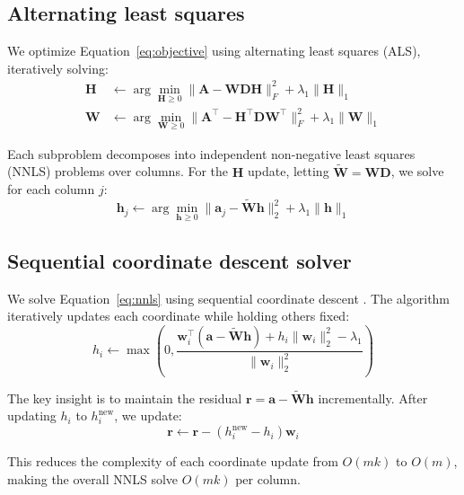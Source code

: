 \documentclass[article]{jss_modified}
\begin{document}
\subsection{Alternating least squares}

We optimize Equation~\ref{eq:objective} using alternating least squares (ALS), 
iteratively solving:
\begin{align}
  \mathbf{H} &\leftarrow \arg\min_{\mathbf{H} \geq 0} 
  \|\mathbf{A} - \mathbf{W}\mathbf{D}\mathbf{H}\|_F^2 + \lambda_1\|\mathbf{H}\|_1 
  \label{eq:h_update} \\
  \mathbf{W} &\leftarrow \arg\min_{\mathbf{W} \geq 0} 
  \|\mathbf{A}^\top - \mathbf{H}^\top\mathbf{D}\mathbf{W}^\top\|_F^2 + 
  \lambda_1\|\mathbf{W}\|_1
  \label{eq:w_update}
\end{align}

Each subproblem decomposes into independent non-negative least squares (NNLS) 
problems over columns. For the $\mathbf{H}$ update, letting 
$\tilde{\mathbf{W}} = \mathbf{W}\mathbf{D}$, we solve for each column $j$:
\begin{equation}
  \mathbf{h}_j \leftarrow \arg\min_{\mathbf{h} \geq 0} 
  \|\mathbf{a}_j - \tilde{\mathbf{W}}\mathbf{h}\|_2^2 + \lambda_1\|\mathbf{h}\|_1
  \label{eq:nnls}
\end{equation}

\subsection{Sequential coordinate descent solver}

We solve Equation~\ref{eq:nnls} using sequential coordinate descent 
\citep{Franc2005}. The algorithm iteratively updates each coordinate while 
holding others fixed:
\begin{equation}
  h_i \leftarrow \max\left(0, \frac{\mathbf{w}_i^\top(\mathbf{a} - 
  \tilde{\mathbf{W}}\mathbf{h}) + h_i \|\mathbf{w}_i\|_2^2 - \lambda_1}
  {\|\mathbf{w}_i\|_2^2}\right)
  \label{eq:cd_update}
\end{equation}

The key insight is to maintain the residual $\mathbf{r} = \mathbf{a} - 
\tilde{\mathbf{W}}\mathbf{h}$ incrementally. After updating $h_i$ to 
$h_i^{\text{new}}$, we update:
\begin{equation}
  \mathbf{r} \leftarrow \mathbf{r} - (h_i^{\text{new}} - h_i)\mathbf{w}_i
  \label{eq:residual_update}
\end{equation}

This reduces the complexity of each coordinate update from $O(mk)$ to $O(m)$, 
making the overall NNLS solve $O(mk)$ per column.
\end{document}
